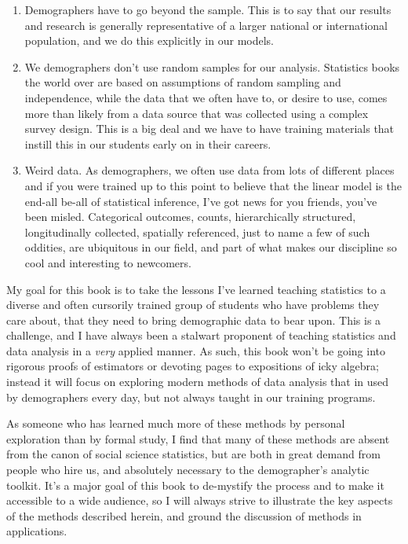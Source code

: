 \documentclass[
  letterpaper,
  DIV=11,
  numbers=noendperiod]{scrreprt}
\begin{document}
\begin{enumerate}
\def\labelenumi{\arabic{enumi}.}
\item
  Demographers have to go beyond the sample. This is to say that our
  results and research is generally representative of a larger national
  or international population, and we do this explicitly in our models.
\item
  We demographers don't use random samples for our analysis. Statistics
  books the world over are based on assumptions of random sampling and
  independence, while the data that we often have to, or desire to use,
  comes more than likely from a data source that was collected using a
  complex survey design. This is a big deal and we have to have training
  materials that instill this in our students early on in their careers.
\item
  Weird data. As demographers, we often use data from lots of different
  places and if you were trained up to this point to believe that the
  linear model is the end-all be-all of statistical inference, I've got
  news for you friends, you've been misled. Categorical outcomes,
  counts, hierarchically structured, longitudinally collected, spatially
  referenced, just to name a few of such oddities, are ubiquitous in our
  field, and part of what makes our discipline so cool and interesting
  to newcomers.
\end{enumerate}

My goal for this book is to take the lessons I've learned teaching
statistics to a diverse and often cursorily trained group of students
who have problems they care about, that they need to bring demographic
data to bear upon. This is a challenge, and I have always been a
stalwart proponent of teaching statistics and data analysis in a
\emph{very} applied manner. As such, this book won't be going into
rigorous proofs of estimators or devoting pages to expositions of icky
algebra; instead it will focus on exploring modern methods of data
analysis that in used by demographers every day, but not always taught
in our training programs.

As someone who has learned much more of these methods by personal
exploration than by formal study, I find that many of these methods are
absent from the canon of social science statistics, but are both in
great demand from people who hire us, and absolutely necessary to the
demographer's analytic toolkit. It's a major goal of this book to
de-mystify the process and to make it accessible to a wide audience, so
I will always strive to illustrate the key aspects of the methods
described herein, and ground the discussion of methods in applications.
\end{document}
